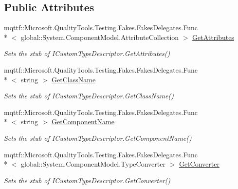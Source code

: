 \subsection*{Public Attributes}
\begin{DoxyCompactItemize}
\item 
mqttf\-::\-Microsoft.\-Quality\-Tools.\-Testing.\-Fakes.\-Fakes\-Delegates.\-Func\\*
$<$ global\-::\-System.\-Component\-Model.\-Attribute\-Collection $>$ \hyperlink{class_system_1_1_component_model_1_1_fakes_1_1_stub_i_custom_type_descriptor_a9f97fd41d6b3d33c8ea77847f7fad074}{Get\-Attributes}
\begin{DoxyCompactList}\small\item\em Sets the stub of I\-Custom\-Type\-Descriptor.\-Get\-Attributes()\end{DoxyCompactList}\item 
mqttf\-::\-Microsoft.\-Quality\-Tools.\-Testing.\-Fakes.\-Fakes\-Delegates.\-Func\\*
$<$ string $>$ \hyperlink{class_system_1_1_component_model_1_1_fakes_1_1_stub_i_custom_type_descriptor_a2db03967132aaafb053e5dd78e30254c}{Get\-Class\-Name}
\begin{DoxyCompactList}\small\item\em Sets the stub of I\-Custom\-Type\-Descriptor.\-Get\-Class\-Name()\end{DoxyCompactList}\item 
mqttf\-::\-Microsoft.\-Quality\-Tools.\-Testing.\-Fakes.\-Fakes\-Delegates.\-Func\\*
$<$ string $>$ \hyperlink{class_system_1_1_component_model_1_1_fakes_1_1_stub_i_custom_type_descriptor_ae60e6f0f392c73fd4debdfab4835c062}{Get\-Component\-Name}
\begin{DoxyCompactList}\small\item\em Sets the stub of I\-Custom\-Type\-Descriptor.\-Get\-Component\-Name()\end{DoxyCompactList}\item 
mqttf\-::\-Microsoft.\-Quality\-Tools.\-Testing.\-Fakes.\-Fakes\-Delegates.\-Func\\*
$<$ global\-::\-System.\-Component\-Model.\-Type\-Converter $>$ \hyperlink{class_system_1_1_component_model_1_1_fakes_1_1_stub_i_custom_type_descriptor_adc794304cbf6fc8aa7103a0105d42f34}{Get\-Converter}
\begin{DoxyCompactList}\small\item\em Sets the stub of I\-Custom\-Type\-Descriptor.\-Get\-Converter()\end{DoxyCompactList}\item 

\end{DoxyCompactItemize}
